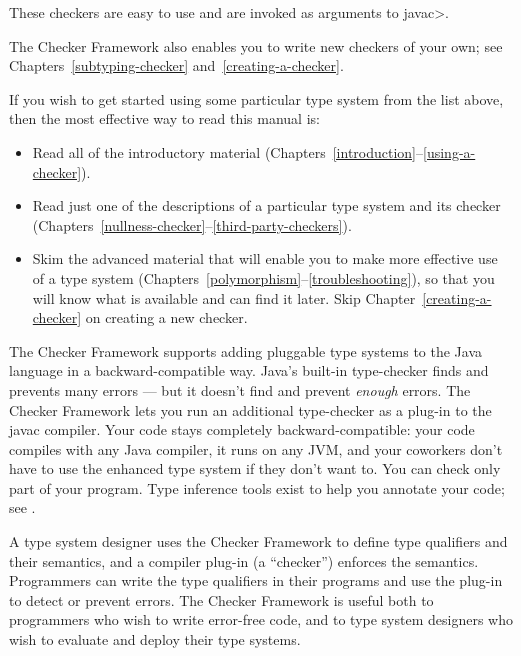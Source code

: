 \noindent
These checkers are easy to use and are invoked as arguments to \<javac>.


The Checker Framework also enables you to write new checkers of your
own; see Chapters~\ref{subtyping-checker} and~\ref{creating-a-checker}.



If you wish to get started using some particular type system from the list
above, then the most effective way to read this manual is:

\begin{itemize}
\item
  Read all of the introductory material
  (Chapters~\ref{introduction}--\ref{using-a-checker}).
\item
  Read just one of the descriptions of a particular type system and its
  checker (Chapters~\ref{nullness-checker}--\ref{third-party-checkers}).
\item
  Skim the advanced material that will enable you to make more effective
  use of a type system
  (Chapters~\ref{polymorphism}--\ref{troubleshooting}), so that you will
  know what is available and can find it later.  Skip
  Chapter~\ref{creating-a-checker} on creating a new checker.
\end{itemize}



The Checker Framework supports adding
pluggable type systems to the Java language in a backward-compatible way.
Java's built-in type-checker finds and prevents many errors --- but it
doesn't find and prevent \emph{enough} errors.  The Checker Framework lets you
run an additional type-checker as a plug-in to the javac compiler.  Your
code stays completely backward-compatible:  your code compiles with any
Java compiler, it runs on any JVM, and your coworkers don't have to use the
enhanced type system if they don't want to.  You can check only part of
your program.  Type inference tools exist to help you annotate your
code; see .


A type system designer uses the Checker Framework to define type qualifiers
and their semantics, and a
compiler plug-in (a ``checker'') enforces the semantics.  Programmers can
write the type qualifiers in their programs and use the plug-in to detect
or prevent errors.  The Checker Framework is useful both to programmers who
wish to write error-free code, and to type system designers who wish to
evaluate and deploy their type systems.




